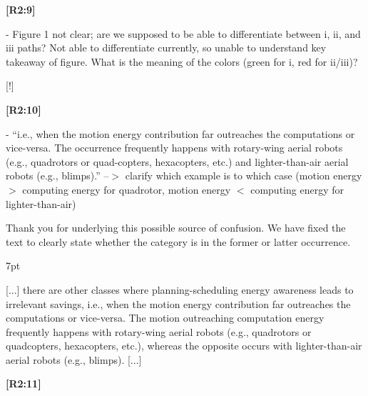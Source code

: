\documentclass[10pt]{letter}
\newenvironment{formal}{%
  \def\FrameCommand{%
    \hspace{1pt}%
    {\color{red}\vrule width 2pt}%
    {\color{formalshade}\vrule width 4pt}%
    \colorbox{formalshade}%
  }%
  \MakeFramed{\advance\hsize-\width\FrameRestore}%
  \noindent\hspace{-4.55pt}%
  \begin{adjustwidth}{}{7pt}%
  \vspace{2pt}\vspace{2pt}%
}
{%
  \vspace{2pt}\end{adjustwidth}\endMakeFramed%
}
\begin{document}
{\hspace*{-4.5em}\textbf{[R2:9]}\vspace*{-1.9em}}

- Figure 1 not clear; are we supposed to be able to differentiate between i, ii, and iii paths? Not able to differentiate currently, so unable to understand key takeaway of figure. What is the meaning of the colors (green for i, red for ii/iii)?
  
{\color{blue} 

{\hspace*{-4.5em}{[R2:9]}\vspace*{-1.9em}}

[!]}

{\hspace*{-4.5em}\textbf{[R2:10]}\vspace*{-1.9em}}

- ``i.e., when the motion energy contribution far outreaches the computations or vice-versa. The occurrence frequently happens with rotary-wing aerial robots (e.g., quadrotors or quad-copters, hexacopters, etc.) and lighter-than-air aerial robots (e.g., blimps).'' --$>$ clarify which example is to which case (motion energy $>$ computing energy for quadrotor, motion energy $<$ computing energy for lighter-than-air)
  
{\color{blue} 

{\hspace*{-4.5em}{[R2:10]}\vspace*{-1.9em}}

Thank you for underlying this possible source of confusion. We have fixed the text to clearly state whether the category is in the former or latter occurrence.

\begin{formal}
  \color{black} [...] there are other classes where planning-scheduling energy awareness leads to irrelevant savings, i.e., when the motion energy contribution far outreaches the computations or vice-versa. The {\color{blue}motion outreaching computation energy} frequently happens with rotary-wing aerial robots (e.g., quadrotors or quadcopters, hexacopters, etc.){\color{blue}, whereas the opposite occurs with} lighter-than-air aerial robots (e.g., blimps). [...]
  \vspace*{1ex}
\end{formal}}

{\hspace*{-4.5em}\textbf{[R2:11]}\vspace*{-1.9em}}
\end{document}
